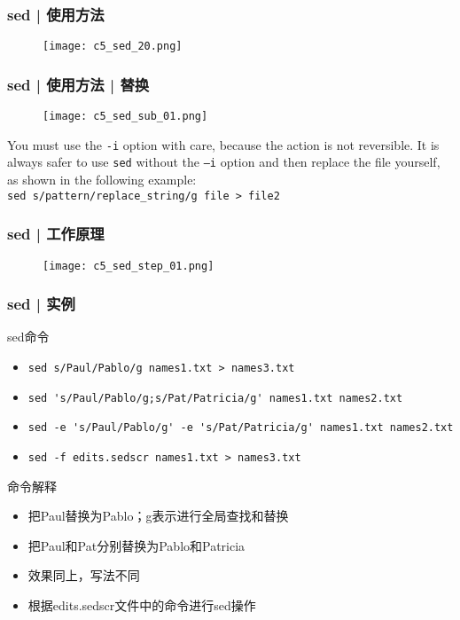 \begin{frame}
  \frametitle{sed | 使用方法}
  \begin{figure}
    \centering
    \texttt{[image: c5\_sed\_20.png]}
  \end{figure}
\end{frame}

\begin{frame}[fragile]
  \frametitle{sed | 使用方法 | 替换}
  \begin{figure}
    \centering
    \texttt{[image: c5\_sed\_sub\_01.png]}
  \end{figure}
  You must use the \verb|-i| option with care, because the action is not reversible. It is always safer to use \verb|sed| without the \verb|–i| option and then replace the file yourself, as shown in the following example: \\ \verb|sed s/pattern/replace_string/g file > file2|
\end{frame}

\begin{frame}
  \frametitle{sed | 工作原理}
  \begin{figure}
    \centering
    \texttt{[image: c5\_sed\_step\_01.png]}
  \end{figure}
\end{frame}

\begin{frame}[fragile]
  \frametitle{sed | \alert{实例}}
  \begin{block}{sed命令}
    \begin{itemize}
      \item<2-> \verb|sed s/Paul/Pablo/g names1.txt > names3.txt|
      \item<4-> \verb|sed 's/Paul/Pablo/g;s/Pat/Patricia/g' names1.txt names2.txt|
      \item<6-> \verb|sed -e 's/Paul/Pablo/g' -e 's/Pat/Patricia/g' names1.txt names2.txt|
      \item<8-> \verb|sed -f edits.sedscr names1.txt > names3.txt|
    \end{itemize}
  \end{block}
  \begin{block}{命令解释}
    \begin{itemize}
      \item<3-> 把Paul替换为Pablo；g表示进行全局查找和替换
      \item<5-> 把Paul和Pat分别替换为Pablo和Patricia
      \item<7-> 效果同上，写法不同
      \item<9-> 根据edits.sedscr文件中的命令进行sed操作
    \end{itemize}
  \end{block}
\end{frame}

